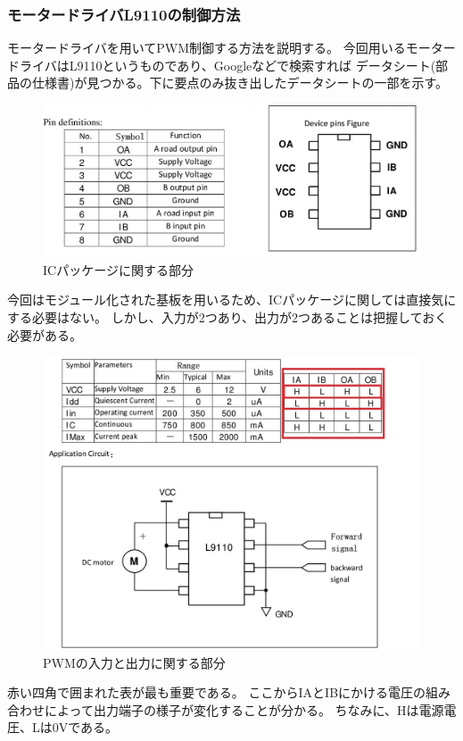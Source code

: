 \documentclass[uplatex]{jsarticle}
\begin{document}
\subsubsection{モータードライバL9110の制御方法}
モータードライバを用いてPWM制御する方法を説明する。
今回用いるモータードライバはL9110というものであり、Googleなどで検索すれば
データシート(部品の仕様書)が見つかる。下に要点のみ抜き出したデータシートの一部を示す。
\begin{figure}[htbp]
    \centering
    \includegraphics[width=13cm]{datasheet_1.jpg}
    \caption{ICパッケージに関する部分}
\end{figure}
今回はモジュール化された基板を用いるため、ICパッケージに関しては直接気にする必要はない。
しかし、入力が2つあり、出力が2つあることは把握しておく必要がある。
\begin{figure}[htbp]
    \centering
    \includegraphics[width=13cm]{datasheet_2.jpg}
    \caption{PWMの入力と出力に関する部分}
\end{figure}
赤い四角で囲まれた表が最も重要である。
ここからIAとIBにかける電圧の組み合わせによって出力端子の様子が変化することが分かる。
ちなみに、Hは電源電圧、Lは0Vである。
\end{document}
